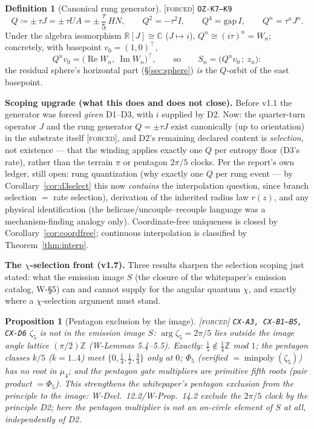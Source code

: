 \documentclass[11pt]{article}
\newcommand{\tagF}{\textcolor{cF}{\textsc{[forced]}}}
\newcommand{\hx}[1]{\textcolor{cC}{\footnotesize\texttt{#1}}}
\newcommand{\Z}{\mathbb{Z}}
\newcommand{\R}{\mathbb{R}}
\newcommand{\C}{\mathbb{C}}
\newcommand{\gapc}{\mathrm{gap}}
\DeclareMathOperator{\Rea}{Re}
\DeclareMathOperator{\Ima}{Im}
\theoremstyle{plain}
\newtheorem{proposition}[theorem]{Proposition}
\theoremstyle{definition}
\newtheorem{definition}[theorem]{Definition}
\theoremstyle{remark}
\begin{document}
\begin{definition}[Canonical rung generator]\label{def:Q}\tagF{} \hx{OZ-K7--K9}
\[
Q \coloneqq \pm\,\tau J=\pm\,\tau UA=\pm\,\frac{\tau}{5}\,HN,
\qquad
Q^2=-\tau^2I,\qquad Q^4=\gapc\,I,\qquad Q^n=\tau^nJ^n .
\]
Under the algebra isomorphism $\R[J]\cong\C$ ($J\mapsto i$), $Q^n\cong(i\tau)^n
=W_n$; concretely, with basepoint $v_0=(1,0)^{\!\top}$,
\[
Q^nv_0=\bigl(\Rea W_n,\ \Ima W_n\bigr)^{\!\top},
\qquad\text{so}\qquad
S_n=\bigl(Q^nv_0\,;\ z_n\bigr):
\]
the residual sphere's horizontal part (\S\ref{sec:sphere}) \emph{is} the
$Q$-orbit of the east basepoint.
\end{definition}

\smallskip\noindent
\textbf{Scoping upgrade (what this does and does not close).} Before v1.1 the
generator was forced \emph{given} D1--D3, with $i$ supplied by D2. Now: the
quarter-turn operator $J$ and the rung generator $Q=\pm\tau J$ exist
canonically (up to orientation) in the substrate itself \tagF{}, and D2's
remaining declared content is \emph{selection}, not existence --- that the
winding applies exactly one $Q$ per entropy floor (D3's rate), rather than the
terrain $\pi$ or pentagon $2\pi/5$ clocks. Per the report's own ledger, still
open: rung quantization (why exactly one $Q$ per rung event --- by
Corollary~\ref{cor:d3select} this now \emph{contains} the interpolation
question, since branch selection $=$ rate selection), derivation of the
inherited radius law $r(z)$, and any physical identification (the
helicase/uncouple--recouple language was a mechanism-finding analogy only).
Coordinate-free uniqueness is closed by Corollary~\ref{cor:coordfree};
continuous interpolation is classified by Theorem~\ref{thm:interp}.

\smallskip\noindent
\textbf{The $\chi$-selection front (v1.7).} Three results sharpen the
selection scoping just stated: what the emission image $S$ (the closure of
the whitepaper's emission catalog, W-\S5) can and cannot supply for the
angular quantum $\chi$, and exactly where a $\chi$-selection argument must
stand.

\begin{proposition}[Pentagon exclusion by the image]\label{prop:pentimage}\tagF{} \hx{CX-A3, CX-B1--B5, CX-D6}
$\zeta_5$ is not in the emission image $S$: $\arg\zeta_5=2\pi/5$ lies
outside the image angle lattice $(\pi/2)\Z$ (W-Lemmas 5.4--5.5). Exactly:
$\tfrac15\notin\tfrac14\Z$ mod $1$; the pentagon classes $k/5$ ($k=1..4$)
meet $\{0,\tfrac14,\tfrac12,\tfrac34\}$ only at $0$; $\Phi_5$ (verified
$=\operatorname{minpoly}(\zeta_5)$) has no root in $\mu_4$; and the
pentagon gate multipliers are primitive fifth roots (pair product
$=\Phi_5$). This \emph{strengthens} the whitepaper's pentagon exclusion
from the principle to the image: W-Decl.\ 12.2/W-Prop.\ 14.2 exclude the
$2\pi/5$ clock \emph{by the principle} D2; here the pentagon multiplier is
not an on-circle element of $S$ at all, independently of D2.
\end{proposition}
\end{document}
